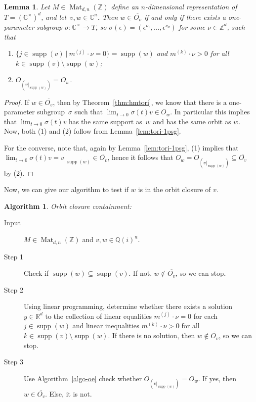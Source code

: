 \documentclass[10pt,a4paper]{article}
\DeclareMathOperator{\supp}{supp}
\DeclareMathOperator{\Mat}{Mat}
\newtheorem{lemma}[theorem]{Lemma}
\theoremstyle{definition}
\newtheorem{algorithm}[theorem]{Algorithm}
\numberwithin{equation}{section}
\newcommand{\QQ}{\mathbb{Q}}
\newcommand{\CC}{\mathbb{C}}
\newcommand{\ZZ}{\mathbb{Z}}
\newcommand{\RR}{\mathbb{R}}
\begin{document}
\begin{lemma} \label{lem:tori-occ-justify}
Let $M \in\Mat_{d,n}(\ZZ)$ define an $n$-dimensional representation of $T = (\CC^\times)^d$, and let~$v,w \in \CC^n$.
Then $w \in \overline{O_v}$ if and only if there exists a one-parameter subgroup $\sigma\colon \CC^\times \to T$, so $\sigma(\epsilon) = (\epsilon^{\nu_1},\dots,\epsilon^{\nu_d})$ for some $\nu\in\ZZ^d$, such that
\begin{enumerate}
\item $ \{j \in \supp(v) \ | \ m^{(j)} \cdot \nu =  0\} = \supp(w)$ and $m^{(k)} \cdot \nu > 0$ for all $k \in \supp(v) \setminus \supp(w)$;
\item $O_{(v|_{\supp(w)})} = O_w$.
\end{enumerate}
\end{lemma}

\begin{proof}
If $w \in \overline{O_v}$, then by Theorem~\ref{thm:hmtori}, we know that there is a one-parameter subgroup~$\sigma$ such that $\lim_{t \to 0} \sigma(t) v \in O_w$.
In particular this implies that $\lim_{t \to 0} \sigma(t) v$ has the same support as~$w$ and has the same orbit as $w$.
Now, both (1) and (2) follow from Lemma~\ref{lem:tori-1psg}.

For the converse, note that, again by Lemma~\ref{lem:tori-1psg}, (1) implies that $\lim_{t \to 0} \sigma(t) v = v|_{\supp(w)} \in \overline{O_v}$, hence it follows that $O_w = O_{(v|_{\supp(w)})} \subseteq \overline{O_v}$ by (2).
\end{proof}

Now, we can give our algorithm to test if $w$ is in the orbit closure of $v$.

\begin{algorithm} \label{algo:occ} \emph{Orbit closure containment:}
\begin{description}
\item[Input]  $M \in \Mat_{d,n}(\ZZ)$ and $v,w \in \QQ(i)^n$.
\item[Step 1] Check if $\supp(w) \subseteq \supp(v)$. If not, $w \notin \overline{O_v}$, so we can stop.
\item[Step 2]  Using linear programming, determine whether there exists a solution $y\in\RR^d$ to the collection of linear equalities $m^{(j)} \cdot \nu = 0$ for each $j \in \supp(w)$ and linear inequalities $m^{(k)} \cdot \nu > 0$ for all $k \in \supp(v) \setminus \supp(w)$.
If there is no solution, then $w \notin \overline{O_v}$, so we can stop.
\item[Step 3]  Use Algorithm~\ref{algo-oe} check whether $O_{(v|_{\supp(w)})} = O_w$. If yes, then $w \in \overline{O_v}$. Else, it is not.
\end{description}
\end{algorithm}
\end{document}
